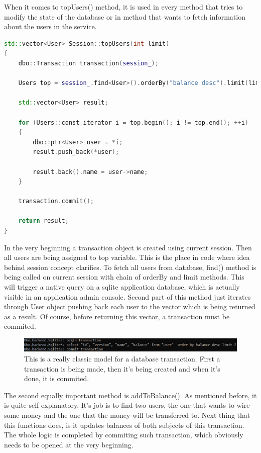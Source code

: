 \documentclass[a4paper,12pt]{book}
\begin{document}
{\bigskip
When it comes to topUsers() method, it is used in every method that tries to modify the state of the database or in method that wants to fetch information about the users in the service.

\bigskip
\begin{lstlisting}[frame=single, basicstyle=\small, language=C++, caption={Session::topUsers() method.}, captionpos=b]
std::vector<User> Session::topUsers(int limit)
{
	dbo::Transaction transaction(session_);

	Users top = session_.find<User>().orderBy("balance desc").limit(limit);

	std::vector<User> result;
	
	for (Users::const_iterator i = top.begin(); i != top.end(); ++i) 
	{
		dbo::ptr<User> user = *i;
		result.push_back(*user);

		result.back().name = user->name;
	}

	transaction.commit();

	return result;
}
\end{lstlisting}

\bigskip
In the very beginning a transaction object is created using current session. Then all users are being assigned to top variable. This is the place in code where idea behind session concept clarifies. To fetch all users from database, find() method is being called on current session with chain of orderBy and limit methods. This will trigger a native query on a sqlite application database, which is actually visible in an application admin console. Second part of this method just iterates through User object pushing back each user to the vector which is being returned as a result. Of course, before returning this vector, a transaction must be commited.

\begin{figure}[H]
\centering
\includegraphics[width=1.0\textwidth]{transaction}
\caption{This is a really classic model for a database transaction. First a transaction is being made, then it's being created and when it's done, it is commited.}
\end{figure}

\bigskip
The second equally important method is addToBalance(). As mentioned before, it is quite self-explanatory. It's job is to find two users, the one that wants to wire some money and the one that the money will be transferred to. Next thing that this functions does, is it updates balances of both subjects of this transaction. The whole logic is completed by commiting such transaction, which obviously needs to be opened at the very beginning.

}
\end{document}
